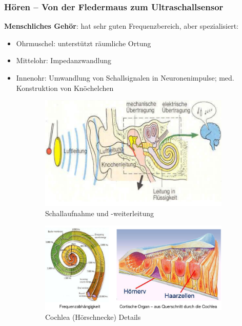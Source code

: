 \subsubsection{Hören – Von der Fledermaus zum Ultraschallsensor}
\textbf{Menschliches Gehör}:
hat sehr guten Frequenzbereich, aber spezialisiert:
\begin{itemize}
\item Ohrmuschel: unterstützt räumliche Ortung
\item Mittelohr: Impedanzwandlung
\item Innenohr: Umwandlung von Schallsignalen in Neuronenimpulse; med. Konstruktion von Knöchelchen
\end{itemize}
\begin{figure}[h!]
	\begin{subfigure}{.5\textwidth}
		\includegraphics[width=\linewidth]{figures/ch04_schall.png}
		\caption{Schallaufnahme und -weiterleitung}
	\end{subfigure}
	\begin{subfigure}{.5\textwidth}
		\includegraphics[width=\linewidth]{figures/ch04_cochlea.png}
		\caption{Cochlea (H\"{o}rschnecke) Details}
	\end{subfigure}
	\caption{}
	\label{hoeren}
\end{figure}

